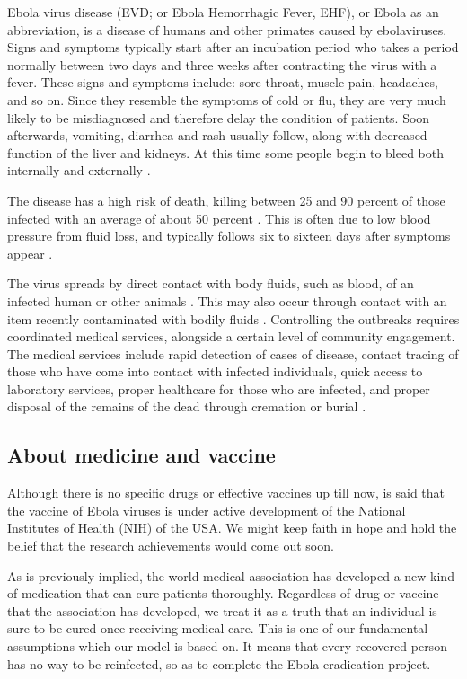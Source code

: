 \documentclass[11pt]{article}
\begin{document}
Ebola virus disease (EVD; or Ebola Hemorrhagic Fever, EHF), or Ebola as an abbreviation, is a disease of humans and other primates caused by ebolaviruses. Signs and symptoms typically start after an incubation period who takes a period normally between two days and three weeks after contracting the virus with a fever. These signs and symptoms include: sore throat, muscle pain, headaches, and so on. Since they resemble the symptoms of cold or flu, they are very much likely to be misdiagnosed and therefore delay the condition of patients. Soon afterwards, vomiting, diarrhea and rash usually follow, along with decreased function of the liver and kidneys. At this time some people begin to bleed both internally and externally \cite{Ebolavirusdisease}.

The disease has a high risk of death, killing between 25 and 90 percent of those infected with an average of about 50 percent \cite{Ebolavirusdisease}. This is often due to low blood pressure from fluid loss, and typically follows six to sixteen days after symptoms appear \cite{singh2014viral}.

The virus spreads by direct contact with body fluids, such as blood, of an infected human or other animals \cite{Ebolavirusdisease}. This may also occur through contact with an item recently contaminated with bodily fluids \cite{Ebolavirusdisease}. Controlling the outbreaks requires coordinated medical services, alongside a certain level of community engagement. The medical services include rapid detection of cases of disease, contact tracing of those who have come into contact with infected individuals, quick access to laboratory services, proper healthcare for those who are infected, and proper disposal of the remains of the dead through cremation or burial \cite{Ebolavirusdisease, GuidanceforSafeHandling}.

\subsection{About medicine and vaccine}

Although there is no specific drugs or effective vaccines up till now, is said that the vaccine of Ebola viruses is under active development of the National Institutes of Health (NIH) of the USA. We might keep faith in hope and hold the belief that the research achievements would come out soon.

As is previously implied, the world medical association has developed a new kind of medication that can cure patients thoroughly. Regardless of drug or vaccine that the association has developed, we treat it as a truth that an individual is sure to be cured once receiving medical care. This is one of our fundamental assumptions which our model is based on. It means that every recovered person has no way to be reinfected, so as to complete the Ebola eradication project. 
\end{document}
